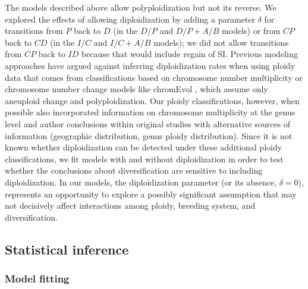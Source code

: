 The models described above allow polyploidization but not its reverse.
We explored the effects of allowing diploidization by adding a parameter $\delta$ for transitions from $P$ back to $D$ (in the $D/P$ and $D/P+A/B$ models) or from $CP$ back to $CD$ (in the $I/C$ and $I/C+A/B$ models); we did not allow transitions from $CP$ back to $ID$ because that would include regain of SI.
Previous modeling approaches \citep{mayrose_2011} have argued against inferring diploidization rates when using ploidy data that comes from classifications based on chromosome number multiplicity or chromosome number change models like chromEvol \citep{mayrose_2010, glick2014, mayrose_2015, freyman_2017}, which assume only aneuploid change and polyploidization.
Our ploidy classifications, however, when possible also incorporated information on chromosome multiplicity at the genus level and author conclusions within original studies with alternative sources of information (\eg geographic distribution, genus ploidy distribution).
Since it is not known whether diploidization can be detected under these additional ploidy classifications, we fit models with and without diploidization in order to test whether the conclusions about diversification are sensitive to including diploidization.
In our models, the diploidization parameter (or its absence, $\delta=0$), represents an opportunity to explore a possibly significant assumption that may not decisively affect interactions among ploidy, breeding system, and diversification.

\subsection{Statistical inference}

\subsubsection{Model fitting}

